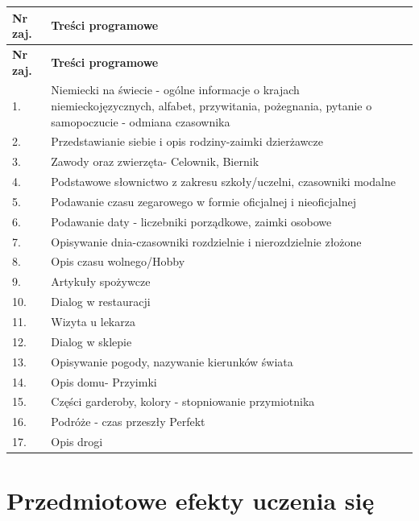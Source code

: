 \documentclass[12pt, a4paper]{article}
\newcommand{\thdrule}{\noalign{\global\setlength{\extrarowheight}{0pt}}}
\newcommand{\thdend}{\noalign{\global\setlength{\extrarowheight}{3pt}}}
\begin{document}
{\scriptsize
\begin{longtable}{m{1.5cm}m{14.5cm}}
\thdrule\toprule
\rowcolor{pjatkRed} {\color{white}\textbf{Nr zaj.}} & {\color{white}\textbf{Treści programowe}} \\
\midrule\thdend
\endfirsthead
\thdrule\toprule
\rowcolor{pjatkRed} {\color{white}\textbf{Nr zaj.}} & {\color{white}\textbf{Treści programowe}} \\
\midrule\thdend
\endhead
  \rowcolor{tableRowLight} 1. & Niemiecki na świecie - ogólne informacje o krajach niemieckojęzycznych, alfabet, przywitania, pożegnania, pytanie o samopoczucie - odmiana czasownika \\
  \rowcolor{tableRowAlt} 2. & Przedstawianie siebie i opis rodziny-zaimki dzierżawcze \\
  \rowcolor{tableRowLight} 3. & Zawody oraz zwierzęta- Celownik, Biernik \\
  \rowcolor{tableRowAlt} 4. & Podstawowe słownictwo z zakresu szkoły/uczelni, czasowniki modalne \\
  \rowcolor{tableRowLight} 5. & Podawanie czasu zegarowego w formie oficjalnej i nieoficjalnej \\
  \rowcolor{tableRowAlt} 6. & Podawanie daty - liczebniki porządkowe, zaimki osobowe \\
  \rowcolor{tableRowLight} 7. & Opisywanie dnia-czasowniki rozdzielnie i nierozdzielnie złożone \\
  \rowcolor{tableRowAlt} 8. & Opis czasu wolnego/Hobby \\
  \rowcolor{tableRowLight} 9. & Artykuły spożywcze \\
  \rowcolor{tableRowAlt} 10. & Dialog w restauracji \\
  \rowcolor{tableRowLight} 11. & Wizyta u lekarza \\
  \rowcolor{tableRowAlt} 12. & Dialog w sklepie \\
  \rowcolor{tableRowLight} 13. & Opisywanie pogody, nazywanie kierunków świata \\
  \rowcolor{tableRowAlt} 14. & Opis domu- Przyimki \\
  \rowcolor{tableRowLight} 15. & Części garderoby, kolory - stopniowanie przymiotnika \\
  \rowcolor{tableRowAlt} 16. & Podróże - czas przeszły Perfekt \\
  \rowcolor{tableRowLight} 17. & Opis drogi \\
\bottomrule
\end{longtable}}

\section{Przedmiotowe efekty uczenia się}
\end{document}
